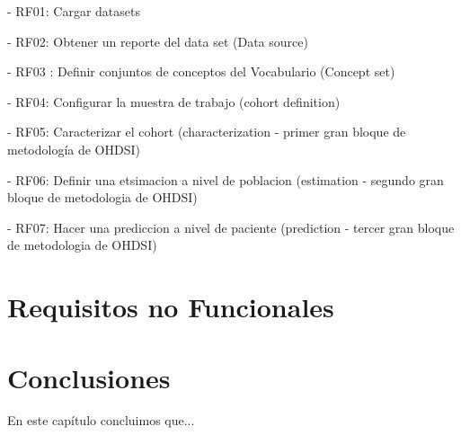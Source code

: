 - RF01: Cargar datasets

- RF02: Obtener un reporte del data set (Data source)

- RF03 : Definir conjuntos de conceptos del Vocabulario (Concept set)

- RF04: Configurar la muestra de trabajo (cohort definition)

- RF05: Caracterizar el cohort (characterization - primer gran bloque de metodología de OHDSI)

- RF06: Definir una etsimacion a nivel de poblacion (estimation - segundo gran bloque de metodologia de OHDSI)

- RF07: Hacer una prediccion a nivel de paciente (prediction - tercer gran bloque de metodologia de OHDSI)
















\section{Requisitos no Funcionales}


\section{Conclusiones}

En este capítulo concluimos que...
